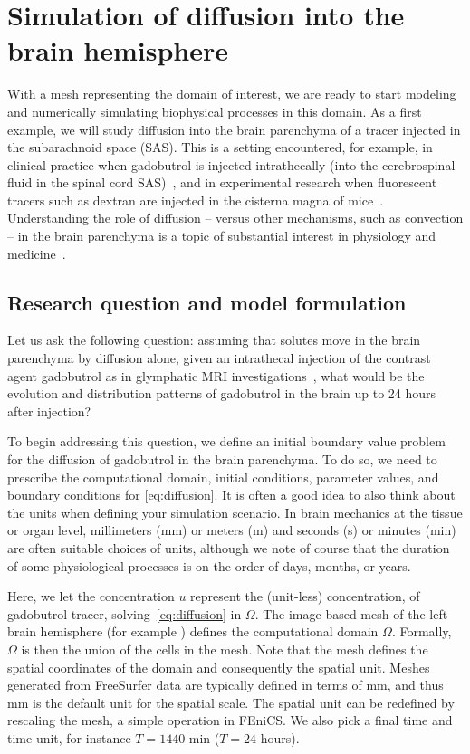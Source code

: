 \section{Simulation of diffusion into the brain hemisphere}
\label{sec:chp3:math}

With a mesh representing the domain of interest, we are ready to start
modeling and numerically simulating biophysical processes in this
domain. As a first example, we will study diffusion into the brain
parenchyma of a tracer injected in the subarachnoid space (SAS). This is a
setting encountered, for example, in clinical practice when gadobutrol is 
injected intrathecally (into the cerebrospinal fluid in the spinal
cord SAS)~\cite{ringstad2018brain}, and in experimental
research when fluorescent tracers such as dextran are injected in the
cisterna magna of mice~\cite{iliff2012paravascular,
  xie2013sleep}. Understanding the role of diffusion -- versus other
mechanisms, such as convection -- in the brain parenchyma is a topic of
substantial interest in physiology and medicine~\cite{abbott2018role}.

\subsection{Research question and model formulation}
\label{chp3:model}

Let us ask the following question: assuming that solutes move in the
brain parenchyma by diffusion alone, given an intrathecal injection of
the contrast agent gadobutrol as in glymphatic MRI
investigations~\cite{ringstad2018brain}, what would be the evolution
and distribution patterns of gadobutrol in the brain up to 24 hours
after injection?

To begin addressing this question, we define an initial boundary value
problem for the diffusion of gadobutrol in the brain parenchyma. To do
so, we need to prescribe the computational domain, initial conditions,
parameter values, and boundary conditions for \eqref{eq:diffusion}. It
is often a good idea to also think about the units when defining your
simulation scenario. In brain mechanics at the tissue or organ level,
millimeters (mm) or meters (m) and seconds (s) or minutes (min) are
often suitable choices of units, although we note of course that the
duration of some physiological processes is on the order of days,
months, or years.

Here, we let the concentration $u$ represent the (unit-less)
concentration, of gadobutrol tracer, solving~\eqref{eq:diffusion} in
$\Omega$. The image-based mesh of the left brain hemisphere (for
example ) defines the computational domain
$\Omega$. Formally, $\Omega$ is then the union of the cells in the
mesh. Note that the mesh defines the spatial coordinates of the domain
and consequently the spatial unit. Meshes generated from FreeSurfer
data are typically defined in terms of mm, and thus mm is the default
unit for the spatial scale. The spatial unit can be redefined by
rescaling the mesh, a simple operation in FEniCS. We also
pick a final time and time unit, for instance $T = 1440$ min ($T = 24$
hours).

